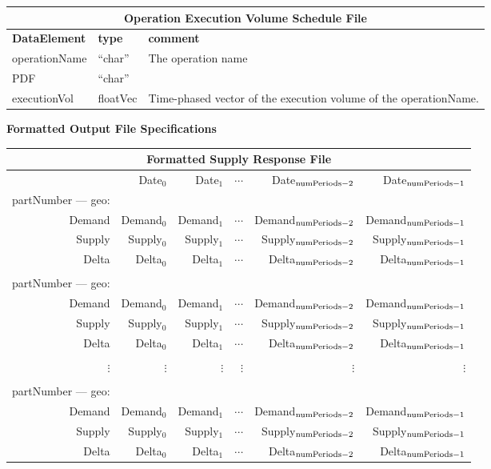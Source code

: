 \vspace{.5in}

\begin{tabular}{llp{4in}}
\multicolumn{3}{c}{{\bf Operation Execution Volume Schedule File}}\\ \hline\hline
{\bf DataElement} &  {\bf type}  &   {\bf comment} \\ \hline
operationName & ``char''  & The operation name \\
PDF        & ``char''  \\
executionVol  & floatVec&  Time-phased vector of the execution volume
  of the operationName.  
\end{tabular}


\clearpage
\noindent
{\bf Formatted Output File Specifications}

\vspace{.5in}

\begin{tabular}{rrrrrr}
\multicolumn{6}{c}{{\bf Formatted Supply Response File}}\\ \hline\hline
  & Date$_0$ & Date$_1$ & $\cdots$ & Date$_{{\rm numPeriods} - 2}$ 
             & Date$_{{\rm numPeriods} - 1}$ \\
partNumber --- geo: \\
Demand & Demand$_0$ & Demand$_1$ & $\cdots$ & Demand$_{{\rm numPeriods} - 2}$ 
             & Demand$_{{\rm numPeriods} - 1}$ \\
Supply & Supply$_0$ & Supply$_1$ & $\cdots$ & Supply$_{{\rm numPeriods} - 2}$ 
             & Supply$_{{\rm numPeriods} - 1}$ \\
Delta & Delta$_0$ & Delta$_1$ & $\cdots$ & Delta$_{{\rm numPeriods} - 2}$ 
             & Delta$_{{\rm numPeriods} - 1}$ \\
\\
partNumber --- geo: \\
Demand & Demand$_0$ & Demand$_1$ & $\cdots$ & Demand$_{{\rm numPeriods} - 2}$ 
             & Demand$_{{\rm numPeriods} - 1}$ \\
Supply & Supply$_0$ & Supply$_1$ & $\cdots$ & Supply$_{{\rm numPeriods} - 2}$ 
             & Supply$_{{\rm numPeriods} - 1}$ \\
Delta & Delta$_0$ & Delta$_1$ & $\cdots$ & Delta$_{{\rm numPeriods} - 2}$ 
             & Delta$_{{\rm numPeriods} - 1}$ \\
\\
$\vdots $ & $\vdots $ & $\vdots $ & $\vdots $ & $\vdots $ & $\vdots $ \\
\\
partNumber --- geo: \\
Demand & Demand$_0$ & Demand$_1$ & $\cdots$ & Demand$_{{\rm numPeriods} - 2}$ 
             & Demand$_{{\rm numPeriods} - 1}$ \\
Supply & Supply$_0$ & Supply$_1$ & $\cdots$ & Supply$_{{\rm numPeriods} - 2}$ 
             & Supply$_{{\rm numPeriods} - 1}$ \\
Delta & Delta$_0$ & Delta$_1$ & $\cdots$ & Delta$_{{\rm numPeriods} - 2}$ 
             & Delta$_{{\rm numPeriods} - 1}$ 
\end{tabular}


